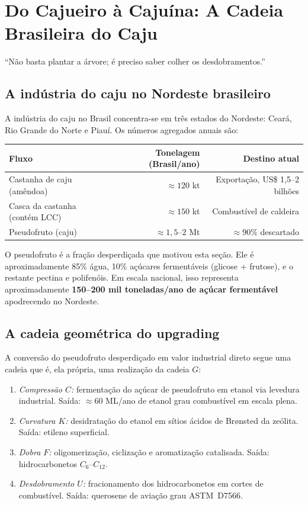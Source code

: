 \documentclass[12pt,a4paper,twoside]{book}
\theoremstyle{plain}
\theoremstyle{definition}
\theoremstyle{definition}
\begin{document}
\chapter{Do Cajueiro à Cajuína: A Cadeia Brasileira do Caju}
\label{cap:caju-industrial}

\epigraph{``Não basta plantar a árvore; é preciso saber colher os
desdobramentos.''}{}

\section{A indústria do caju no Nordeste brasileiro}

A indústria do caju no Brasil concentra-se em três estados do Nordeste:
Ceará, Rio Grande do Norte e Piauí. Os números agregados anuais são:

\begin{center}
\begin{tabular}{lrr}
\toprule
\textbf{Fluxo} & \textbf{Tonelagem (Brasil/ano)} & \textbf{Destino atual} \\
\midrule
Castanha de caju (amêndoa) & $\approx 120$ kt & Exportação, US\$ 1{,}5--2 bilhões \\
Casca da castanha (contém LCC) & $\approx 150$ kt & Combustível de caldeira \\
Pseudofruto (caju) & $\approx 1{,}5$--$2$ Mt & $\approx 90\%$ descartado \\
\bottomrule
\end{tabular}
\end{center}

O pseudofruto é a fração desperdiçada que motivou esta seção. Ele é
aproximadamente 85\% água, 10\% açúcares fermentáveis (glicose +
frutose), e o restante pectina e polifenóis. Em escala nacional,
isso representa aproximadamente \textbf{150--200 mil toneladas/ano
de açúcar fermentável} apodrecendo no Nordeste.

\section{A cadeia geométrica do upgrading}

A conversão do pseudofruto desperdiçado em valor industrial direto segue
uma cadeia que é, ela própria, uma realização da cadeia $G$:
\begin{enumerate}
  \item \emph{Compressão $C$:} fermentação do açúcar de pseudofruto em
        etanol via levedura industrial. Saída: $\approx 60$ ML/ano
        de etanol grau combustível em escala plena.
  \item \emph{Curvatura $K$:} desidratação do etanol em sítios ácidos
        de Brønsted da zeólita. Saída: etileno superficial.
  \item \emph{Dobra $F$:} oligomerização, ciclização e aromatização
        catalisada. Saída: hidrocarbonetos $C_{6}$--$C_{12}$.
  \item \emph{Desdobramento $U$:} fracionamento dos hidrocarbonetos em
        cortes de combustível. Saída: querosene de aviação grau ASTM~D7566.
\end{enumerate}
\end{document}

